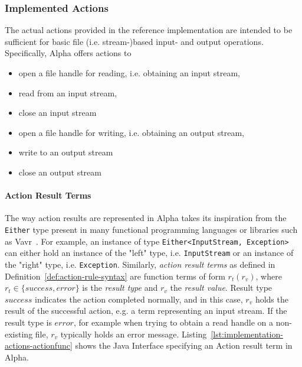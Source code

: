 \subsubsection{Implemented Actions}
\label{subsubsec:implementation-actions-basic-actions}

The actual actions provided in the reference implementation are intended to be sufficient for basic file (i.e. stream-)based input- and output operations. Specifically, Alpha offers actions to
\begin{itemize}
    \item open a file handle for reading, i.e. obtaining an input stream,
    \item read from an input stream,
    \item close an input stream
    \item open a file handle for writing, i.e. obtaining an output stream,
    \item write to an output stream
    \item close an output stream
\end{itemize}

\paragraph{Action Result Terms} The way action results are represented in Alpha takes its inspiration from the \texttt{Either} type present in many functional programming languages or libraries such as Vavr~\cite{vavr-io}. For example, an instance of type \texttt{Either<InputStream, Exception>}
can either hold an instance of the "left" type, i.e. \texttt{InputStream} or an instance of the "right" type, i.e. \texttt{Exception}. Similarly, \emph{action result terms} as defined in Definition~\ref{def:action-rule-syntax} are function terms of form $r_t(r_v)$, where $r_t \in \{success, error\}$ is the \emph{result type} and $r_v$ the \emph{result value}. Result type $success$ indicates the action completed normally, and in this case, $r_v$ holds the result of the successful action, e.g. a term representing an input stream. If the result type is $error$, for example when trying to obtain a read handle on a non-existing file, $r_v$ typically holds an error message.
Listing~\ref{lst:implementation-actions-actionfunc} shows the Java Interface specifying an Action result term in Alpha.

